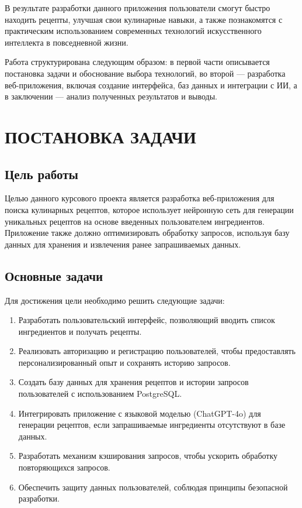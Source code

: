 {{        В результате разработки данного приложения пользователи смогут быстро находить рецепты, улучшая свои кулинарные навыки, а также познакомятся с практическим использованием современных технологий искусственного интеллекта в повседневной жизни. 
        
        Работа структурирована следующим образом: в первой части описывается постановка задачи и обоснование выбора технологий, во второй — разработка веб-приложения, включая создание интерфейса, баз данных и интеграции с ИИ, а в заключении — анализ полученных результатов и выводы.
    }
    \newpage

\newpage

\section{\MakeUppercase{Постановка задачи}}


\subsection*{Цель работы}
Целью данного курсового проекта является разработка веб-приложения для поиска кулинарных рецептов, которое использует нейронную сеть для генерации уникальных рецептов на основе введенных пользователем ингредиентов. Приложение также должно оптимизировать обработку запросов, используя базу данных для хранения и извлечения ранее запрашиваемых данных.

\subsection*{Основные задачи}
Для достижения цели необходимо решить следующие задачи:
\begin{enumerate}
    \item Разработать пользовательский интерфейс, позволяющий вводить список ингредиентов и получать рецепты.
    \item Реализовать авторизацию и регистрацию пользователей, чтобы предоставлять персонализированный опыт и сохранять историю запросов.
    \item Создать базу данных для хранения рецептов и истории запросов пользователей с использованием PostgreSQL.
    \item Интегрировать приложение с языковой моделью (ChatGPT-4o) для генерации рецептов, если запрашиваемые ингредиенты отсутствуют в базе данных.
    \item Разработать механизм кэширования запросов, чтобы ускорить обработку повторяющихся запросов.
    \item Обеспечить защиту данных пользователей, соблюдая принципы безопасной разработки.
\end{enumerate}

}
